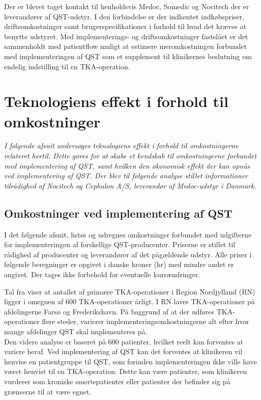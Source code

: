 
Der er blevet taget kontakt til henholdsvis Medoc, Somedic og Nocitech der er leverandører af QST-udstyr. I den forbindelse er der indhentet indkøbspriser, driftsomkostninger samt brugerspecifikationer i forhold til hvad det kræves at benytte udstyret. Med implementerings- og driftsomkostninger fastslået er det sammenholdt med patientflow muligt at estimere meromkostningen forbundet med implementeringen af QST som et supplement til klinikernes beslutning om endelig indstilling til en TKA-operation. 

\section{Teknologiens effekt i forhold til omkostninger} \label{priser}
\textit{I følgende afsnit undersøges teknologiens effekt i forhold til omkostningerne relateret hertil. Dette gøres for at skabe et kendskab til omkostningerne forbundet med implementering af QST, samt hvilken den økonomisk effekt der kan opnås ved implementering af QST. Der blev til følgende analyse stillet informationer tilrådighed af Nocitech og Cephalon A/S, leverandør af Medoc-udstyr i Danmark.}

\subsection{Omkostninger ved implementering af QST}
I det følgende afsnit, listes og udregnes omkostninger forbundet med udgifterne for implementeringen af forskellige QST-producenter. Priserne er stillet til rådighed af producenter og leverandører af det pågældende udstyr. Alle priser i følgende beregninger er opgivet i danske kroner (kr) med mindre andet er angivet. Der tages ikke forbehold for eventuelle kursændringer. 

Tal fra  viser at antallet af primære TKA-operationer i Region Nordjylland (RN) ligger i omegnen af 600 TKA-operationer årligt. \citep{aarsrapport2016} I RN laves TKA-operationer på afdelingerne Farsø og Frederikshavn. På baggrund af at der udføres TKA-operationer flere steder, varierer implementeringsomkostningerne alt efter hvor mange afdelinger QST skal implementeres på. \\
Den videre analyse er baseret på 600 patienter, hvilket reelt kan forventes at variere heraf. Ved implementering af QST kan det forventes at klinikeren vil henvise en patientgruppe til QST, som forinden implementeringen ikke ville have været henvist til en TKA-operation. Dette kan være patienter, som klinikeren vurderer som kroniske smertepatienter eller patienter der befinder sig på grænserne til at være egnet. 

